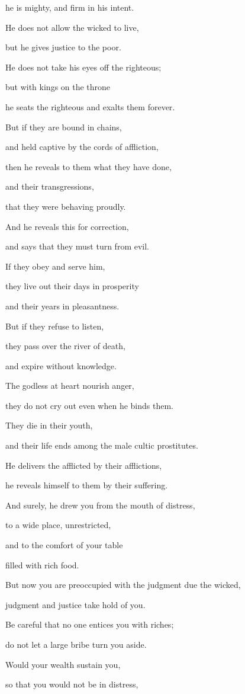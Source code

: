 {\par }{\Q he is mighty,
and firm in his intent.
\par }{\Q {}He does not
allow the wicked
to live,
\par }{\Q but he gives
justice
to the poor.
\par }{\Q {}He does not
take
his eyes
off
the righteous;
\par }{\Q but with
kings
on the throne
\par }{\Q he seats
the righteous and exalts them forever.
\par }{\Q {}But if
they are bound
in chains,
\par }{\Q and held captive
by the cords
of affliction,
\par }{\Q {}then he reveals to them what they
have done,
\par }{\Q and their transgressions,
\par }{\Q that
they were
behaving proudly.
\par }{\Q {}And he reveals
this for correction,
\par }{\Q and says
that
they must turn
from evil.
\par }{\Q {}If
they obey
and serve
him,
\par }{\Q they live
out their days
in prosperity
\par }{\Q and their years
in pleasantness.
\par }{\Q {}But if
they refuse to listen,
\par }{\Q they pass over
the river of death,
\par }{\Q and expire
without
knowledge.
\par }{\Q {}The godless
at heart
nourish
anger,
\par }{\Q they do not
cry out
even when
he binds them.
\par }{\Q {}They die
in their youth,
\par }{\Q and their life
ends among the male cultic prostitutes.
\par }{\Q {}He delivers
the afflicted
by their afflictions,
\par }{\Q he reveals
himself to them
by their suffering.
\par }{\Q {}And surely,
he drew
you from the mouth
of distress,
\par }{\Q to a wide place,
unrestricted,
\par }{\Q and to
the comfort
of your table
\par }{\Q filled
with rich food.
\par }{\Q {}But now you are preoccupied
with
the judgment due the wicked,
\par }{\Q judgment
and justice
take hold of you.
\par }{\Q {}Be careful
that
no one entices
you with riches;
\par }{\Q do not
let a large
bribe
turn you aside.
\par }{\Q {}Would your wealth
sustain
you,
\par }{\Q so that you would not
be in distress,

}
